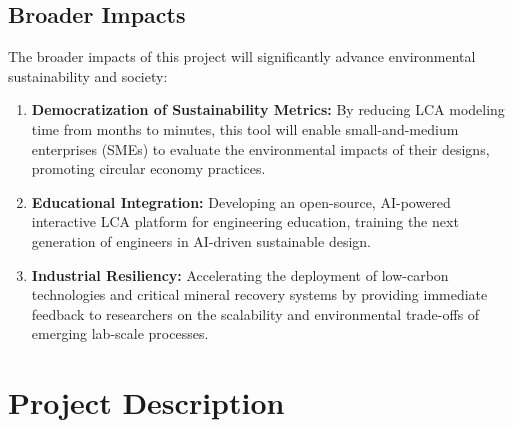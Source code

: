 \documentclass[11pt]{article}
\begin{document}
\subsection{Broader Impacts}
The broader impacts of this project will significantly advance environmental sustainability and society:
\begin{enumerate}
    \item \textbf{Democratization of Sustainability Metrics:} By reducing LCA modeling time from months to minutes, this tool will enable small-and-medium enterprises (SMEs) to evaluate the environmental impacts of their designs, promoting circular economy practices.
    \item \textbf{Educational Integration:} Developing an open-source, AI-powered interactive LCA platform for engineering education, training the next generation of engineers in AI-driven sustainable design.
    \item \textbf{Industrial Resiliency:} Accelerating the deployment of low-carbon technologies and critical mineral recovery systems by providing immediate feedback to researchers on the scalability and environmental trade-offs of emerging lab-scale processes.
\end{enumerate}

\newpage
\section{Project Description}
\end{document}
